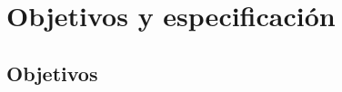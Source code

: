 %
%
%
%
%
%
%
%
%
%

\chapter{Objetivos y especificaci\'on}
\label{cap3}
\label{cap:objetivos}

\begin{FraseCelebre}
\begin{Frase}
\end{Frase}
\begin{Fuente}
\end{Fuente}
\end{FraseCelebre}


\section{Objetivos}
\label{cap3:sec:obejtivos}

